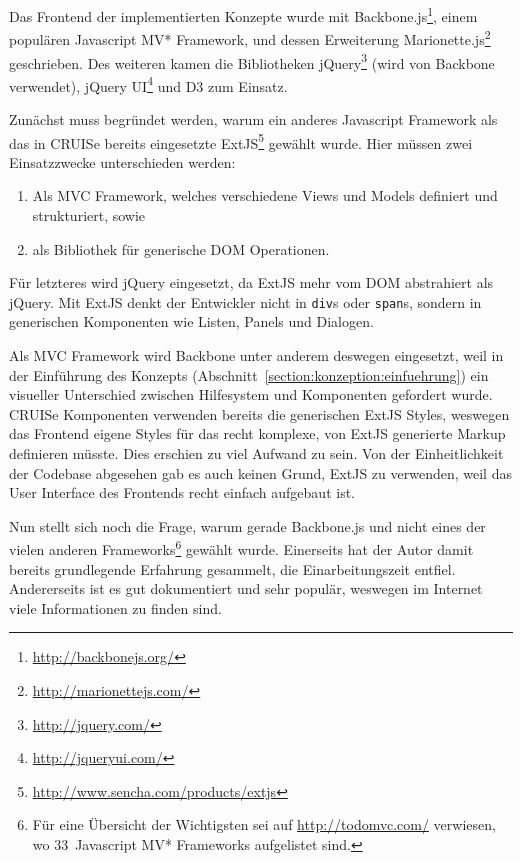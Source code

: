 \documentclass[
	headsepline,
	footsepline,
	fontsize=12pt,
	bibliography=totoc
]{scrbook}
\begin{document}
Das Frontend der implementierten Konzepte wurde mit Backbone.js\footnote{\url{http://backbonejs.org/}}, einem populären Javascript MV* Framework, und dessen Erweiterung Marionette.js\footnote{\url{http://marionettejs.com/}} geschrieben. Des weiteren kamen die Bibliotheken jQuery\footnote{\url{http://jquery.com/}} (wird von Backbone verwendet), jQuery UI\footnote{\url{http://jqueryui.com/}} und D3 \cite{Bostock2011} zum Einsatz.

Zunächst muss begründet werden, warum ein anderes Javascript Framework als das in CRUISe bereits eingesetzte ExtJS\footnote{\url{http://www.sencha.com/products/extjs}} gewählt wurde. Hier müssen zwei Einsatzzwecke unterschieden werden:

\begin{enumerate}
	\item Als MVC Framework, welches verschiedene Views und Models definiert und strukturiert, sowie
	\item als Bibliothek für generische DOM Operationen.
\end{enumerate}

Für letzteres wird jQuery eingesetzt, da ExtJS mehr vom DOM abstrahiert als jQuery. Mit ExtJS denkt der Entwickler nicht in \texttt{div}s oder \texttt{span}s, sondern in generischen Komponenten wie Listen, Panels und Dialogen.

Als MVC Framework wird Backbone unter anderem deswegen eingesetzt, weil in der Einführung des Konzepts (Abschnitt~\ref{section:konzeption:einfuehrung}) ein visueller Unterschied zwischen Hilfesystem und Komponenten gefordert wurde. CRUISe Komponenten verwenden bereits die generischen ExtJS Styles, weswegen das Frontend eigene Styles für das recht komplexe, von ExtJS generierte Markup definieren müsste. Dies erschien zu viel Aufwand zu sein. Von der Einheitlichkeit der Codebase abgesehen gab es auch keinen Grund, ExtJS zu verwenden, weil das User Interface des Frontends recht einfach aufgebaut ist.

Nun stellt sich noch die Frage, warum gerade Backbone.js und nicht eines der vielen anderen Frameworks\footnote{Für eine Übersicht der Wichtigsten sei auf \url{http://todomvc.com/} verwiesen, wo 33~Javascript MV* Frameworks aufgelistet sind.} gewählt wurde. Einerseits hat der Autor damit bereits grundlegende Erfahrung gesammelt, die Einarbeitungszeit entfiel. Andererseits ist es gut dokumentiert und sehr populär, weswegen im Internet viele Informationen zu finden sind.
\end{document}
